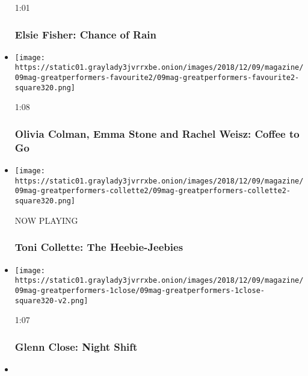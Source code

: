 \begin{itemize}
  1:01

  \hypertarget{elsie-fisher-chance-of-rain}{%
  \subsubsection{Elsie Fisher: Chance of
  Rain}\label{elsie-fisher-chance-of-rain}}
\item
  \href{https://www.nytimes3xbfgragh.onion/video/magazine/100000006246697/olivia-colman-emma-stone-and-rachel-weisz-coffee-to-go.html?action=click\&module=video-series-bar\&region=header\&pgtype=Article\&playlistId=video/great-performers}{}

  \texttt{[image: https://static01.graylady3jvrrxbe.onion/images/2018/12/09/magazine/09mag-greatperformers-favourite2/09mag-greatperformers-favourite2-square320.png]}

  1:08

  \hypertarget{olivia-colman-emma-stone-and-rachel-weisz-coffee-to-go}{%
  \subsubsection{Olivia Colman, Emma Stone and Rachel Weisz: Coffee to
  Go}\label{olivia-colman-emma-stone-and-rachel-weisz-coffee-to-go}}
\item
  \texttt{[image: https://static01.graylady3jvrrxbe.onion/images/2018/12/09/magazine/09mag-greatperformers-collette2/09mag-greatperformers-collette2-square320.png]}

  NOW PLAYING

  \hypertarget{toni-collette-the-heebie-jeebies-1}{%
  \subsubsection{Toni Collette: The
  Heebie-Jeebies}\label{toni-collette-the-heebie-jeebies-1}}
\item
  \href{https://www.nytimes3xbfgragh.onion/video/magazine/100000006246513/glenn-close-night-shift.html?action=click\&module=video-series-bar\&region=header\&pgtype=Article\&playlistId=video/great-performers}{}

  \texttt{[image: https://static01.graylady3jvrrxbe.onion/images/2018/12/09/magazine/09mag-greatperformers-1close/09mag-greatperformers-1close-square320-v2.png]}

  1:07

  \hypertarget{glenn-close-night-shift}{%
  \subsubsection{Glenn Close: Night
  Shift}\label{glenn-close-night-shift}}
\item
  \href{https://www.nytimes3xbfgragh.onion/video/magazine/100000006246384/yalitza-aparicio-the-daisy.html?action=click\&module=video-series-bar\&region=header\&pgtype=Article\&playlistId=video/great-performers}{}


\end{itemize}
